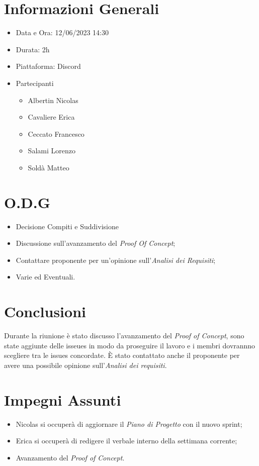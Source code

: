 \documentclass[a4paper, 12pt]{article}
\begin{document}
\makefrontpage

\section*{Informazioni Generali}
\begin{itemize}
    \item Data e Ora: 12/06/2023 14:30
    \item Durata: 2h
    \item Piattaforma: Discord
    \item Partecipanti
    \begin{itemize}
        \item Albertin Nicolas
        \item Cavaliere Erica
        \item Ceccato Francesco
        \item Salami Lorenzo
        \item Soldà Matteo
    \end{itemize}
\end{itemize}

\section*{O.D.G}
\begin{itemize}
    \item Decisione Compiti e Suddivisione
    \item Discussione sull'avanzamento del \textit{Proof Of Concept};
    \item Contattare proponente per un'opinione sull'\textit{Analisi dei Requisiti};
    \item Varie ed Eventuali.
\end{itemize}

\section*{Conclusioni}
Durante la riunione è stato discusso l'avanzamento del \textit{Proof of Concept}, sono state aggiunte delle isseues in modo da proseguire il lavoro e i membri dovrannno scegliere tra le issues concordate. \newline
È stato contattato anche il proponente per avere una possibile opinione sull'\textit{Analisi dei requisiti}.

\section*{Impegni Assunti}
\begin{itemize}
    \item Nicolas si occuperà di aggiornare il \textit{Piano di Progetto} con il nuovo sprint;
    \item Erica si occuperà di redigere il verbale interno della settimana corrente;
    \item Avanzamento del \textit{Proof of Concept}.
\end{itemize}
\end{document}
